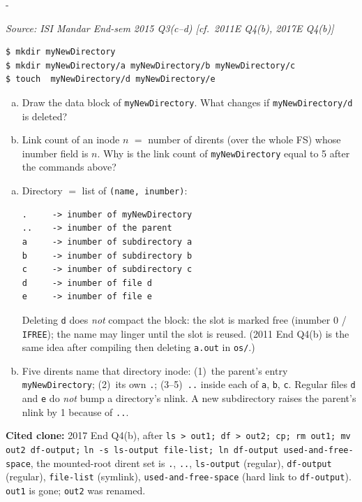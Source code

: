 \documentclass[11pt,a4paper]{article}
\makeatletter
\newcommand{\keepspace}[1]{\par\penalty-100\begingroup
  \setlength{\dimen@}{#1}\dimen@ii\pagegoal\advance\dimen@ii-\pagetotal
  \ifdim\dimen@>\dimen@ii\ifdim\dimen@ii>\z@\vfil\fi\break\fi\endgroup}
\newcounter{qn}[section]
\newenvironment{Qn}[4]{%
  \refstepcounter{qn}\keepspace{7\baselineskip}%
  \begin{tcolorbox}[qboxstyle, title={Q\thesection.\theqn\ \ [#1 \textbar\ #2]\ \ #4}]%
  {\footnotesize\color{g3}\textit{Source: #3}}\par\smallskip%
}{%
  \end{tcolorbox}%
}
\newenvironment{Sol}{%
  \begin{tcolorbox}[sboxstyle, title={Solution}]%
}{%
  \end{tcolorbox}\vspace{0.35em}%
}
\makeatother
\begin{document}
\begin{Qn}{Medium-Hard}{Lect 23}{ISI Mandar End-sem 2015 Q3(c--d) [cf.\ 2011E Q4(b), 2017E Q4(b)]}{Directory block after mkdir/touch, and why nlink $=5$}
\begin{lstlisting}[numbers=none]
$ mkdir myNewDirectory
$ mkdir myNewDirectory/a myNewDirectory/b myNewDirectory/c
$ touch  myNewDirectory/d myNewDirectory/e
\end{lstlisting}
\begin{enumerate}[(c)]
\item Draw the data block of \texttt{myNewDirectory}. What changes if
      \texttt{myNewDirectory/d} is deleted?
\item Link count of an inode $n$ $=$ number of dirents (over the whole
      FS) whose inumber field is $n$. Why is the link count of
      \texttt{myNewDirectory} equal to 5 after the commands above?
\end{enumerate}
\end{Qn}
\begin{Sol}
\begin{enumerate}[(c)]
\item Directory $=$ list of \texttt{(name, inumber)}:
\begin{lstlisting}[numbers=none]
.     -> inumber of myNewDirectory
..    -> inumber of the parent
a     -> inumber of subdirectory a
b     -> inumber of subdirectory b
c     -> inumber of subdirectory c
d     -> inumber of file d
e     -> inumber of file e
\end{lstlisting}
      Deleting \texttt{d} does \emph{not} compact the block: the slot
      is marked free (inumber 0 / \texttt{IFREE}); the name may linger
      until the slot is reused. (2011 End Q4(b) is the same idea after
      compiling then deleting \texttt{a.out} in \texttt{os/}.)
\item Five dirents name that directory inode:
      (1)~the parent's entry \texttt{myNewDirectory};
      (2)~its own \texttt{.};
      (3--5)~\texttt{..} inside each of \texttt{a}, \texttt{b},
      \texttt{c}. Regular files \texttt{d} and \texttt{e} do \emph{not}
      bump a directory's nlink. A new subdirectory raises the parent's
      nlink by 1 because of \texttt{..}.
\end{enumerate}
\textbf{Cited clone:} 2017 End Q4(b), after
\texttt{ls > out1; df > out2; cp; rm out1; mv out2 df-output;}
\texttt{ln -s ls-output file-list; ln df-output used-and-free-space},
the mounted-root dirent set is
\texttt{.}, \texttt{..}, \texttt{ls-output} (regular),
\texttt{df-output} (regular), \texttt{file-list} (symlink),
\texttt{used-and-free-space} (hard link to \texttt{df-output}).
\texttt{out1} is gone; \texttt{out2} was renamed.
\end{Sol}
\end{document}
